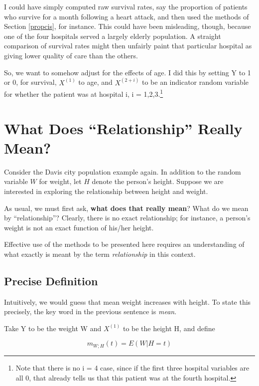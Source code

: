 I could have simply computed raw survival rates, say the proportion of
patients who survive for a month following a heart attack, and then used
the methods of Section \ref{propcis}, for instance.  This could have
been misleading, though, because one of the four hospitals served a
largely elderly population.  A straight comparison of survival rates
might then unfairly paint that particular hospital as giving lower
quality of care than the others.

So, we want to somehow adjust for the effects of age.  I did this by
setting Y to 1 or 0, for survival, $X^{(1)}$ to age, and $X^{(2+i)}$ to be
an indicator random variable for whether the patient was at hospital i,
i = 1,2,3.\footnote{Note that there is no i = 4 case, since if the first
three hospital variables are all 0, that already tells us that this
patient was at the fourth hospital.}

\section{What Does ``Relationship'' Really Mean?}
\label{regintro}

Consider the Davis city population example again.  In addition to the
random variable $W$ for weight, let $H$ denote the person's height.
Suppose we are interested in exploring the relationship between height
and weight.

As usual, we must first ask, {\bf what does that really mean}?  What do
we mean by ``relationship''?  Clearly, there is no exact relationship;
for instance, a person's weight is not an exact function of his/her
height.

Effective use of the methods to be presented here requires an
understanding of what exactly is meant by the term {\it relationship} in
this context.

\subsection{Precise Definition}

Intuitively, we would guess that mean weight increases with
height.  To state this precisely, the key word in the previous sentence
is {\it mean}.

Take Y to be the weight W and $X^{(1)}$ to be the height H, and define

\begin{equation}
\label{firstreg}
m_{W;H}(t) = E(W|H = t)
\end{equation}

